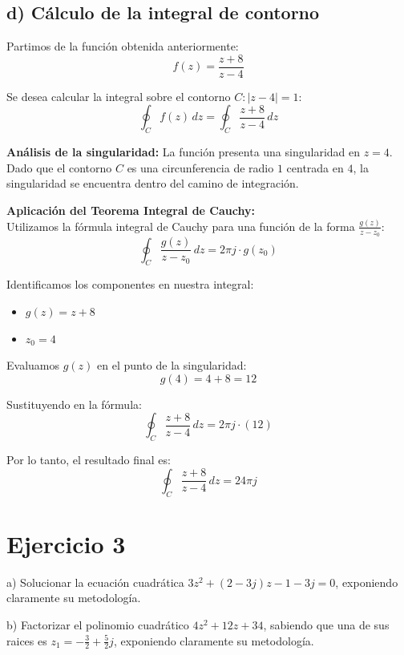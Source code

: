 \documentclass[a4paper, 12pt]{article}
\begin{document}
\subsection{d) Cálculo de la integral de contorno}

Partimos de la función obtenida anteriormente:
\begin{equation}
    f(z) = \frac{z+8}{z-4}
\end{equation}

Se desea calcular la integral sobre el contorno $C: |z-4|=1$:
\[ \oint_{C} f(z) \, dz = \oint_{C} \frac{z+8}{z-4} \, dz \]

\textbf{Análisis de la singularidad:}
La función presenta una singularidad en $z=4$. Dado que el contorno $C$ es una circunferencia de radio $1$ centrada en $4$, la singularidad se encuentra dentro del camino de integración.

\textbf{Aplicación del Teorema Integral de Cauchy:} \\
Utilizamos la fórmula integral de Cauchy para una función de la forma $\frac{g(z)}{z-z_0}$:
\[ \oint_{C} \frac{g(z)}{z-z_0} \, dz = 2\pi j \cdot g(z_0) \]

Identificamos los componentes en nuestra integral:
\begin{itemize}
    \item $g(z) = z+8$
    \item $z_0 = 4$
\end{itemize}

Evaluamos $g(z)$ en el punto de la singularidad:
\[ g(4) = 4 + 8 = 12 \]

Sustituyendo en la fórmula:
\[ \oint_{C} \frac{z+8}{z-4} \, dz = 2\pi j \cdot (12) \]

Por lo tanto, el resultado final es:
\begin{equation}
\boxed{    \oint_{C} \frac{z+8}{z-4} \, dz = 24\pi j}
\end{equation}

\newpage

\section{Ejercicio 3}
a) Solucionar la ecuación cuadrática $3z^2 + (2-3j)z - 1 - 3j = 0$, exponiendo claramente su 
metodología.

\vspace{0.4cm}

b) Factorizar el polinomio cuadrático $4z^2 + 12z + 34$, sabiendo que una de sus raices es $z_1
= -\frac{3}{2} + \frac{5}{2}j$, exponiendo claramente su metodología.
\end{document}
